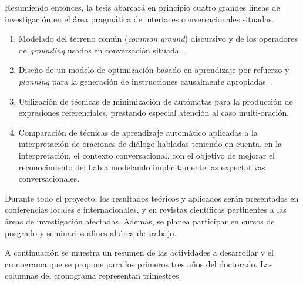 \documentclass[10.9pt,a4paper]{article}
\begin{document}
Resumiendo entonces, la tesis abarcar\'a en principio cuatro grandes l\'ineas 
de investigaci\'on en el \'area pragm\'atica de interfaces conversacionales 
situadas.
\begin{enumerate}

    \item Modelado del terreno com\'un (\emph{common ground}) 
    discursivo y de los operadores de \emph{grounding} usados en 
    conversaci\'on situada~\citep{benotti-EtAl:2012:ACL2012short}.

    \item Dise\~no de un modelo de optimizaci\'on basado en aprendizaje 
    por refuerzo y \emph{planning} para la generaci\'on de instrucciones 
    causalmente apropiadas~\citep{beno:acl11}.

    \item Utilizaci\'on de t\'ecnicas de minimizaci\'on de aut\'omatas para la 
    producci\'on de expresiones referenciales, prestando especial atenci\'on 
    al caso multi-oraci\'on.

    \item Comparaci\'on de t\'ecnicas de aprendizaje autom\'atico aplicadas 
    a la interpretaci\'on de oraciones de di\'alogo habladas teniendo en cuenta, 
    en la interpretaci\'on, el contexto conversacional, con el objetivo de 
    mejorar el reconocimiento del habla modelando impl\'icitamente las 
    expectativas conversacionales. 

\end{enumerate}

Durante todo el proyecto, los resultados te\'oricos y aplicados ser\'an 
presentados en conferencias locales e internacionales, y en revistas 
cient\'ificas pertinentes a las \'areas de investigaci\'on afectadas.
Adem\'as, se planea participar en cursos de posgrado y seminarios afines
al \'area de trabajo. 

A continuaci\'on se muestra un resumen de las actividades a desarrollar y 
el cronograma que se propone para los primeros tres a\~nos del doctorado.
Las columnas del cronograma representan trimestres.
\end{document}
